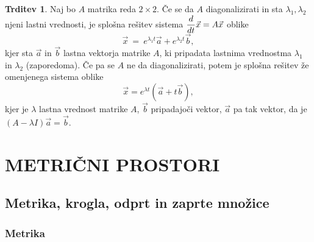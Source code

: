 \documentclass[11pt]{article}
\theoremstyle{definition}
\theoremstyle{definition}
\newtheorem{trditev}{Trditev}[section]
\theoremstyle{definition}
\begin{document}
\begin{trditev}

Naj bo $A$ matrika reda $2 \times 2$. Če se da $A$ diagonalizirati in sta $\lambda_1, \lambda_2$ njeni lastni vrednosti, je splošna rešitev sistema $\mathlarger{\frac{d}{dt}\vec{x} = A\vec{x}}$ oblike
$$\vec{x} ~=~ e^{\lambda_1 t}\vec{a} + e^{\lambda_2 t}\vec{b},$$
kjer sta $\vec{a}$ in $\vec{b}$ lastna vektorja matrike $A$, ki pripadata lastnima vrednostma $\lambda_1$ in $\lambda_2$ (zaporedoma). Če pa se $A$ ne da diagonalizirati, potem je splošna rešitev že omenjenega sistema oblike
$$\vec{x} = e^{\lambda t}(\vec{a} + t\vec{b}),$$
kjer je $\lambda$ lastna vrednost matrike $A$, $\vec{b}$ pripadajoči vektor, $\vec{a}$ pa tak vektor, da je $(A - \lambda I)\vec{a} = \vec{b}$.

\end{trditev}
\vspace{0.5cm}


\pagebreak


\section{METRIČNI PROSTORI}
\vspace{0.5cm}


\subsection{Metrika, krogla, odprt in zaprte množice}
\vspace{0.5cm}


\subsubsection{Metrika}
\vspace{0.5cm}
\end{document}
